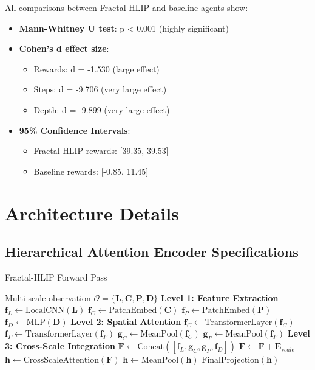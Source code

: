\documentclass[11pt]{article}
\begin{document}
All comparisons between Fractal-HLIP and baseline agents show:
\begin{itemize}
    \item \textbf{Mann-Whitney U test}: p < 0.001 (highly significant)
    \item \textbf{Cohen's d effect size}: 
    \begin{itemize}
        \item Rewards: d = -1.530 (large effect)
        \item Steps: d = -9.706 (very large effect)  
        \item Depth: d = -9.899 (very large effect)
    \end{itemize}
    \item \textbf{95\% Confidence Intervals}:
    \begin{itemize}
        \item Fractal-HLIP rewards: [39.35, 39.53]
        \item Baseline rewards: [-0.85, 11.45]
    \end{itemize}
\end{itemize}

\section{Architecture Details}

\subsection{Hierarchical Attention Encoder Specifications}

\begin{algorithm}
\caption{Fractal-HLIP Forward Pass}
\begin{algorithmic}[1]
\REQUIRE Multi-scale observation $\mathcal{O} = \{\mathbf{L}, \mathbf{C}, \mathbf{P}, \mathbf{D}\}$
\STATE \textbf{Level 1: Feature Extraction}
\STATE $\mathbf{f}_L \leftarrow \text{LocalCNN}(\mathbf{L})$ 
\STATE $\mathbf{f}_C \leftarrow \text{PatchEmbed}(\mathbf{C})$ 
\STATE $\mathbf{f}_P \leftarrow \text{PatchEmbed}(\mathbf{P})$ 
\STATE $\mathbf{f}_D \leftarrow \text{MLP}(\mathbf{D})$ 
\STATE 
\STATE \textbf{Level 2: Spatial Attention}
    \STATE $\mathbf{f}_C \leftarrow \text{TransformerLayer}(\mathbf{f}_C)$
    \STATE $\mathbf{f}_P \leftarrow \text{TransformerLayer}(\mathbf{f}_P)$
\ENDFOR
\STATE $\mathbf{g}_C \leftarrow \text{MeanPool}(\mathbf{f}_C)$
\STATE $\mathbf{g}_P \leftarrow \text{MeanPool}(\mathbf{f}_P)$
\STATE
\STATE \textbf{Level 3: Cross-Scale Integration}
\STATE $\mathbf{F} \leftarrow \text{Concat}([\mathbf{f}_L, \mathbf{g}_C, \mathbf{g}_P, \mathbf{f}_D])$
\STATE $\mathbf{F} \leftarrow \mathbf{F} + \mathbf{E}_{scale}$ 
\STATE $\mathbf{h} \leftarrow \text{CrossScaleAttention}(\mathbf{F})$
\STATE $\mathbf{h} \leftarrow \text{MeanPool}(\mathbf{h})$
\RETURN $\text{FinalProjection}(\mathbf{h})$
\end{algorithmic}
\end{algorithm}
\end{document}
